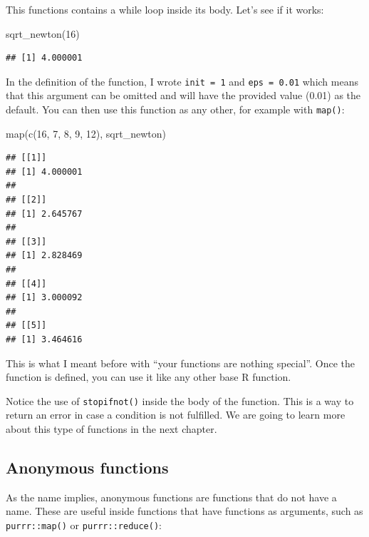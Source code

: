 \documentclass[
]{article}
\newenvironment{Shaded}{\begin{snugshade}}{\end{snugshade}}
\newcommand{\DecValTok}[1]{\textcolor[rgb]{0.00,0.00,0.81}{#1}}
\newcommand{\FunctionTok}[1]{\textcolor[rgb]{0.00,0.00,0.00}{#1}}
\newcommand{\NormalTok}[1]{#1}
\begin{document}
This functions contains a while loop inside its body. Let's see if it works:

\begin{Shaded}
\begin{Highlighting}[]
\FunctionTok{sqrt\_newton}\NormalTok{(}\DecValTok{16}\NormalTok{)}
\end{Highlighting}
\end{Shaded}

\begin{verbatim}
## [1] 4.000001
\end{verbatim}

In the definition of the function, I wrote \texttt{init\ =\ 1} and \texttt{eps\ =\ 0.01} which means that this
argument can be omitted and will have the provided value (0.01) as the default. You can then use
this function as any other, for example with \texttt{map()}:

\begin{Shaded}
\begin{Highlighting}[]
\FunctionTok{map}\NormalTok{(}\FunctionTok{c}\NormalTok{(}\DecValTok{16}\NormalTok{, }\DecValTok{7}\NormalTok{, }\DecValTok{8}\NormalTok{, }\DecValTok{9}\NormalTok{, }\DecValTok{12}\NormalTok{), sqrt\_newton)}
\end{Highlighting}
\end{Shaded}

\begin{verbatim}
## [[1]]
## [1] 4.000001
## 
## [[2]]
## [1] 2.645767
## 
## [[3]]
## [1] 2.828469
## 
## [[4]]
## [1] 3.000092
## 
## [[5]]
## [1] 3.464616
\end{verbatim}

This is what I meant before with ``your functions are nothing special''. Once the function is
defined, you can use it like any other base R function.

Notice the use of \texttt{stopifnot()} inside the body of the function. This is a way to return an error
in case a condition is not fulfilled. We are going to learn more about this type of functions
in the next chapter.

\hypertarget{anonymous-functions}{%
\subsection{Anonymous functions}\label{anonymous-functions}}

As the name implies, anonymous functions are functions that do not have a name. These are useful inside
functions that have functions as arguments, such as \texttt{purrr::map()} or \texttt{purrr::reduce()}:
\end{document}
